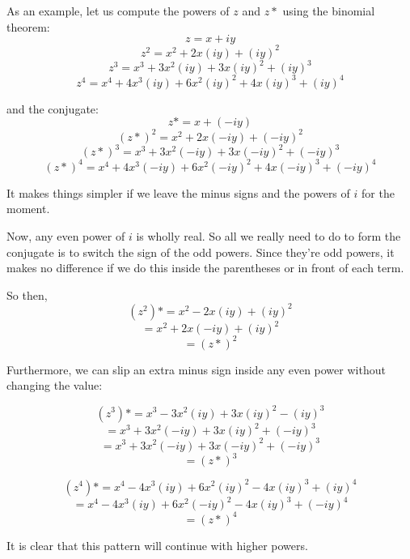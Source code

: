 \documentclass[11pt, oneside]{article}
\begin{document}
As an example, let us compute the powers of $z$ and $z*$ using the binomial theorem:
\[ z = x + iy \]
\[ z^2 = x^2 +  2x(iy) + (iy)^2 \]
\[ z^3 = x^3 + 3x^2(iy) + 3x(iy)^2 + (iy)^3 \]
\[ z^4 = x^4 + 4x^3(iy) + 6x^2(iy)^2 + 4x(iy)^3 + (iy)^4 \]

and the conjugate:
\[ z* = x + (-iy) \]
\[ (z*)^2 = x^2 +  2x(-iy) + (-iy)^2 \]
\[ (z*)^3 = x^3 + 3x^2(-iy) + 3x(-iy)^2 + (-iy)^3 \]
\[ (z*)^4 = x^4 + 4x^3(-iy) + 6x^2(-iy)^2 + 4x(-iy)^3 + (-iy)^4 \]

It makes things simpler if we leave the minus signs and the powers of $i$ for the moment.

Now, any even power of $i$ is wholly real.  So all we really need to do to form the conjugate is to switch the sign of the odd powers.  Since they're odd powers, it makes no difference if we do this inside the parentheses or in front of each term.

So then,
\[ (z^2)* = x^2 - 2x(iy) + (iy)^2 \]
\[ = x^2 + 2x(-iy) + (iy)^2 \]
\[ = (z*)^2 \]

Furthermore, we can slip an extra minus sign inside any even power without changing the value:

\[ (z^3)* = x^3 - 3x^2(iy) + 3x(iy)^2 - (iy)^3 \]
\[ = x^3 + 3x^2(-iy) + 3x(iy)^2 + (-iy)^3 \]
\[ = x^3 + 3x^2(-iy) + 3x(-iy)^2 + (-iy)^3 \]
\[ = (z*)^3 \]

\[ (z^4)* = x^4 - 4x^3(iy) + 6x^2(iy)^2 - 4x(iy)^3 + (iy)^4 \]
\[ = x^4 - 4x^3(iy) + 6x^2(-iy)^2 - 4x(iy)^3 + (-iy)^4 \]
\[ = (z*)^4 \]

It is clear that this pattern will continue with higher powers.
\end{document}
